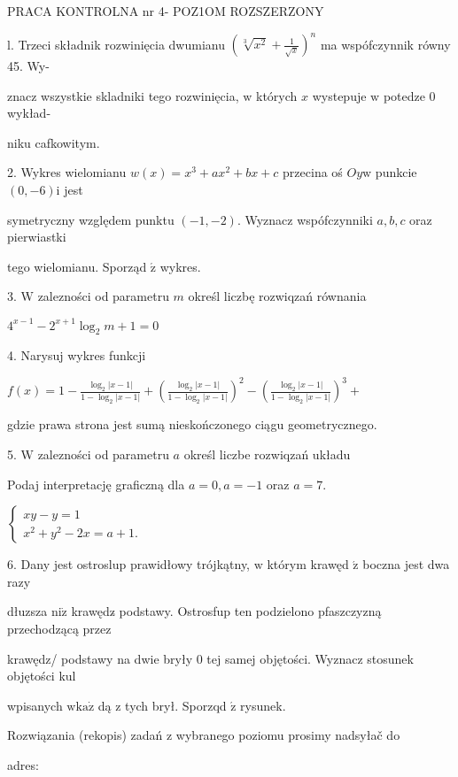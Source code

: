 \documentclass[a4paper,12pt]{article}
\begin{document}
PRACA KONTROLNA nr 4- POZ1OM ROZSZERZONY

l. Trzeci składnik rozwinięcia dwumianu $(\displaystyle \sqrt[3]{x^{2}}+\frac{1}{\sqrt{x}})^{n}$ ma wspófczynnik równy 45. Wy-

znacz wszystkie skladniki tego rozwinięcia, $\mathrm{w}$ których $x$ wystepuje $\mathrm{w}$ potedze $0$ wykład-

niku cafkowitym.

2. Wykres wielomianu $w(x) =x^{3}+ax^{2}+bx+c$ przecina oś $Oy\mathrm{w}$ punkcie $(0,-6) \mathrm{i}$ jest

symetryczny względem punktu $(-1,-2)$. Wyznacz wspófczynniki $a, b, c$ oraz pierwiastki

tego wielomianu. Sporząd $\acute{\mathrm{z}}$ wykres.

3. $\mathrm{W}$ zalezności od parametru $m$ określ liczbę rozwiqzań równania

$4^{x-1}-2^{x+1}\log_{2}m+1=0$

4. Narysuj wykres funkcji

$f(x)=1-\displaystyle \frac{\log_{2}|x-1|}{1-\log_{2}|x-1|}+(\frac{\log_{2}|x-1|}{1-\log_{2}|x-1|})^{2}-(\frac{\log_{2}|x-1|}{1-\log_{2}|x-1|})^{3}+$

gdzie prawa strona jest sumą nieskończonego ciągu geometrycznego.

5. $\mathrm{W}$ zalezności od parametru $a$ określ liczbe rozwiqzań układu

Podaj interpretację graficzną dla $a=0, a=-1$ oraz $a=7.$

$\left\{\begin{array}{l}
xy-y=1\\
x^{2}+y^{2}-2x=a+1.
\end{array}\right.$

6. Dany jest ostroslup prawidłowy trójkątny, $\mathrm{w}$ którym krawęd $\acute{\mathrm{z}}$ boczna jest dwa razy

dłuzsza $\mathrm{n}\mathrm{i}\dot{\mathrm{z}}$ krawędz$\acute{}$ podstawy. Ostrosfup ten podzielono pfaszczyzną przechodzącą przez

krawędz/ podstawy na dwie bryły $0$ tej samej objętości. Wyznacz stosunek objętości kul

wpisanych $\mathrm{w}\mathrm{k}\mathrm{a}\dot{\mathrm{z}}$ dą $\mathrm{z}$ tych brył. Sporzqd $\acute{\mathrm{z}}$ rysunek.

Rozwiązania (rekopis) zadań z wybranego poziomu prosimy nadsyłač do

adres:
\end{document}
